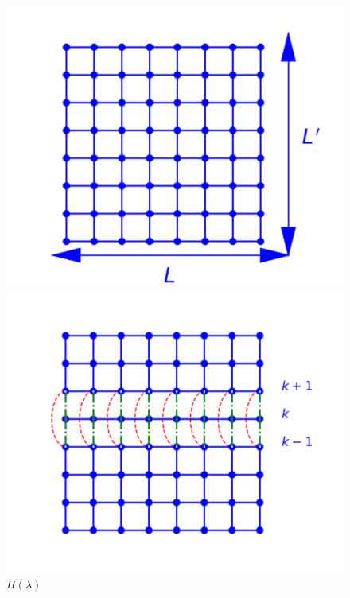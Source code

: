 \begin{figure}
	\begin{minipage}[t]{0.32\linewidth}
		\includegraphics[width=\linewidth]{numerical/cross-h0.pdf}
		\caption*{$H_0$}
	\end{minipage}
	\begin{minipage}[t]{0.32\linewidth}
		\includegraphics[width=\linewidth]{numerical/cross-hlambda.pdf}
		\caption*{$H(\lambda)$}		
	\end{minipage}
	\centering
	\begin{minipage}[t]{0.32\linewidth}

\end{minipage}
\end{figure}
